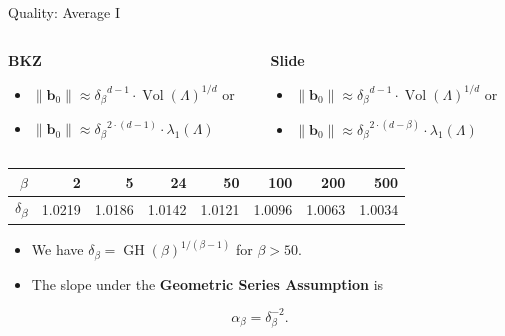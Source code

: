 \documentclass[table,10pt,aspectratio=169]{beamer}
\DeclareMathOperator{\Vol}{Vol}
\DeclareMathOperator{\GH}{GH}
\renewcommand{\vec}[1]{\ensuremath{\mathbf{#1}}\xspace}
\begin{document}
\begin{frame}[label={sec:org3941cb1}]{Quality: Average I}
\begin{columns}[t]
\begin{column}{0.50\columnwidth}
\textbf{BKZ}

\begin{itemize}
\item \(\|\vec b_{0}\| \approx {\delta_{\beta}}^{{d-1}} \cdot {\Vol(\Lambda)}^{1/d}\) or
\item \(\|\vec b_{0}\| \approx {\delta_{\beta}}^{2\cdot{(d-1)}} \cdot \lambda_{1}(\Lambda)\)
\end{itemize}
\end{column}

\begin{column}{0.50\columnwidth}
\textbf{Slide}

\begin{itemize}
\item \(\|\vec b_{0}\| \approx {\delta_{\beta}}^{{d-1}} \cdot {\Vol(\Lambda)}^{1/d}\) or

\item \(\|\vec b_{0}\| \approx {\delta_{\beta}}^{2\cdot{(d-\beta)}} \cdot \lambda_{1}(\Lambda)\)
\end{itemize}
\end{column}
\end{columns}

\begin{center}
\begin{tabular}{rrrrrrrr}
\toprule
\(\beta\) & 2 & 5 & 24 & 50 & 100 & 200 & 500\\
\midrule
\(\delta\)\textsubscript{\(\beta\)} & 1.0219 & 1.0186 & 1.0142 & 1.0121 & 1.0096 & 1.0063 & 1.0034\\
\bottomrule
\end{tabular}

\end{center}

\begin{itemize}
\item We have \(\delta_{\beta} = \GH(\beta)^{1/(\beta-1)}\) for \(\beta > 50\).
\item The slope under the \textbf{Geometric Series Assumption} is
\end{itemize}
\[\alpha_{\beta} = \delta_{\beta}^{-2}.\]
\end{frame}
\end{document}
